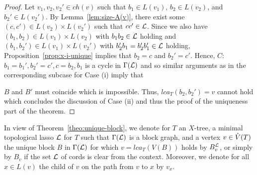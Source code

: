 \begin{proof}
  Let $v_1,v_2,v_2'\in ch(v)$ such that $b_1\in L(v_1)$, $b_2\in L(v_2)$, and
  $b_2'\in L(v_2')$.  By Lemma~\ref{lem:size-A(v)}, there exist some
  $(c,c')\in L(v_2)\times L(v_2')$ such that $cc'\in {\mathcal L}$.  Since we also have
  $(b_1,b_2)\in L(v_1)\times L(v_2)$ with $b_1b_2\in {\mathcal L}$ holding and
  $(b_1,b_2')\in L(v_1)\times L(v_2')$ with $b_2'b_1=b_2'b_1'\in {\mathcal L}$ holding,
  Proposition~\ref{prop:x-i-unique} implies that $b_2=c$ and $b_2'=c'$. Hence,
  $C$: $b_1=b_1',b_2'=c', c=b_2,b_1$ is a cycle in $\Gamma({\mathcal L})$ and so
  similar arguments as in the corresponding subcase for Case (i) imply that

  $B$ and $B'$ must coincide which is impossible. Thus, $lca_T(b_2,b_2')=v$
  cannot hold which concludes the discussion of Case (ii) and thus the proof
  of the uniqueness part of the theorem.
\end{proof}

In view of Theorem~\ref{theo:unique-block}, we denote for $T$ an $X$-tree, a
minimal topological lasso ${\mathcal L}$ for $T$ such that $\Gamma({\mathcal L})$ is a block
graph, and a vertex $v\in \mathring{V}(T)$ the unique block $B$ in $\Gamma({\mathcal L})$ for
which $v=lca_T(V(B))$ holds by $B_v^{{\mathcal L}}$, or simply by $B_v$ if the set
${\mathcal L}$ of cords is clear from the context.  Moreover, we denote for all $x\in
L(v)$ the child of $v$ on the path from $v$ to $x$ by $v_x$.

